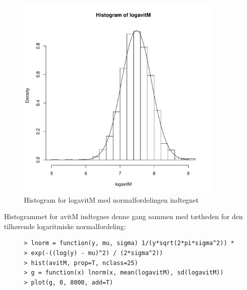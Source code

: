 \begin{figure}[H]
\label{fig:anal12}
\begin{center}
\includegraphics[width=10cm]{graphs/analyse_5.pdf}
\caption{Histogram for logavitM med normalfordelingen indtegnet}
\end{center}
\end{figure}

Histogrammet for avitM indtegnes denne gang sammen med tætheden for 
den tilhørende logaritmiske normalfordeling:

\begin{figure}[H]
\label{fig:anal13}
\begin{center}
\begin{verbatim}
> lnorm = function(y, mu, sigma) 1/(y*sqrt(2*pi*sigma^2)) * 
> exp(-((log(y) - mu)^2) / (2*sigma^2))
> hist(avitM, prop=T, nclass=25)
> g = function(x) lnorm(x, mean(logavitM), sd(logavitM))
> plot(g, 0, 8000, add=T)
\end{verbatim}
\caption{}
\end{center}
\end{figure}

